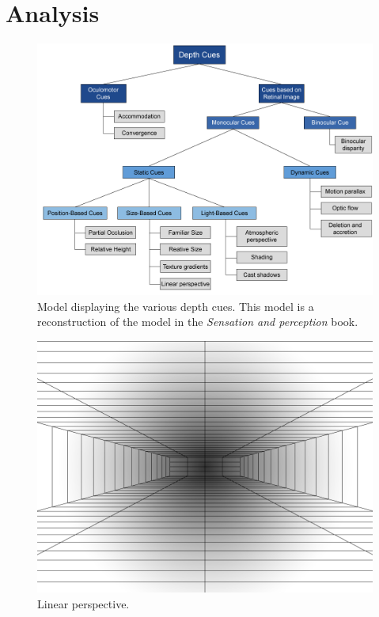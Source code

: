 \section{Analysis}
\begin{figure}[H]
	\centering
	\includegraphics[width=1\linewidth]{figure/Analysis/depthCues.png}
	\caption{Model displaying the various depth cues. This model is a reconstruction of the model in the \textit{Sensation and perception} book\citep[p.~195]{sensationPerception}.}
	\label{fig:depthCues}
\end{figure}

\begin{figure}[H]
	\centering
	\includegraphics[width=1\linewidth]{figure/Analysis/linearPerspective.png}
	\caption{Linear perspective.}
	\label{fig:linearPerspective}
\end{figure}

